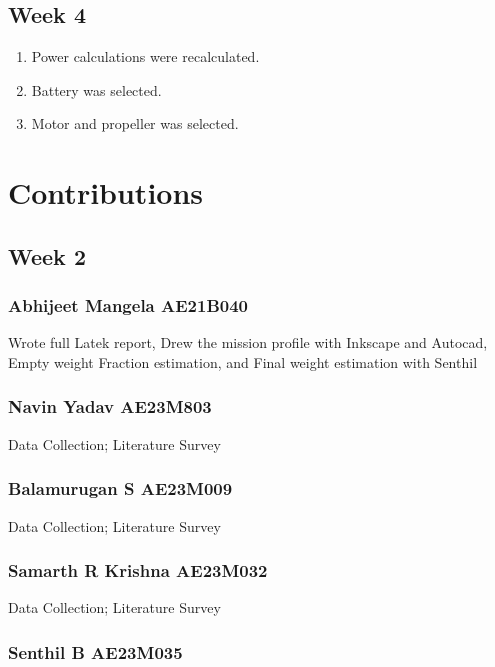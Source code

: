 \documentclass[12 pt]{article}
\begin{document}
\subsection{Week 4}
\begin{enumerate}
    \item Power calculations were recalculated.
    \item Battery was selected.
    \item Motor and propeller was selected.
\end{enumerate}

\subsection{}
\newpage


\section{Contributions}

\subsection{Week 2}

\subsubsection{Abhijeet Mangela AE21B040}
Wrote full Latek report, Drew the mission profile with Inkscape and Autocad, Empty weight Fraction estimation, and Final weight estimation with Senthil

\subsubsection{Navin Yadav AE23M803}

Data Collection; Literature Survey

\subsubsection{Balamurugan S AE23M009}

Data Collection; Literature Survey

\subsubsection{Samarth R Krishna AE23M032}

Data Collection; Literature Survey

\subsubsection{Senthil B AE23M035}
\end{document}
